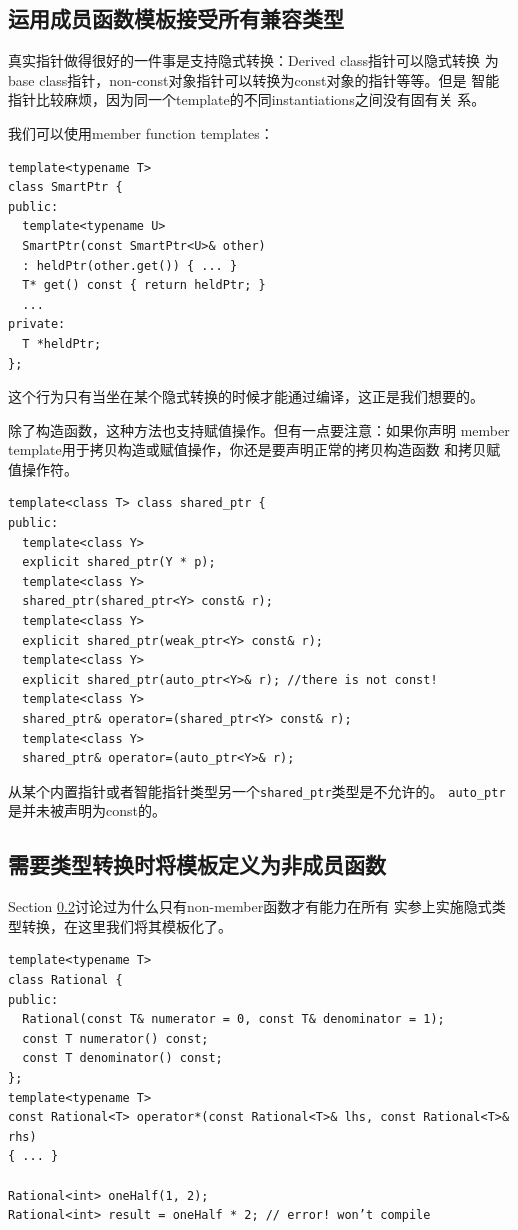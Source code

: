 \subsection{运用成员函数模板接受所有兼容类型}
\label{sec:Item-45}

真实指针做得很好的一件事是支持隐式转换：Derived class指针可以隐式转换
为base class指针，non-const对象指针可以转换为const对象的指针等等。但是
智能指针比较麻烦，因为同一个template的不同instantiations之间没有固有关
系。

我们可以使用member function templates：
\begin{verbatim}
template<typename T>
class SmartPtr {
public:
  template<typename U>
  SmartPtr(const SmartPtr<U>& other)
  : heldPtr(other.get()) { ... } 
  T* get() const { return heldPtr; }
  ...
private:
  T *heldPtr;
};
\end{verbatim}
这个行为只有当坐在某个隐式转换的时候才能通过编译，这正是我们想要的。

除了构造函数，这种方法也支持赋值操作。但有一点要注意：如果你声明
member template用于拷贝构造或赋值操作，你还是要声明正常的拷贝构造函数
和拷贝赋值操作符。
\begin{verbatim}
template<class T> class shared_ptr {
public:
  template<class Y> 
  explicit shared_ptr(Y * p);
  template<class Y> 
  shared_ptr(shared_ptr<Y> const& r); 
  template<class Y> 
  explicit shared_ptr(weak_ptr<Y> const& r);
  template<class Y>
  explicit shared_ptr(auto_ptr<Y>& r); //there is not const!
  template<class Y>
  shared_ptr& operator=(shared_ptr<Y> const& r);
  template<class Y> 
  shared_ptr& operator=(auto_ptr<Y>& r); 
\end{verbatim}
从某个内置指针或者智能指针类型另一个\texttt{shared\_ptr}类型是不允许的。
\texttt{auto\_ptr}是并未被声明为const的。

\subsection{需要类型转换时将模板定义为非成员函数}
\label{sec:Item-46}

Section \ref{sec:Item-46}讨论过为什么只有non-member函数才有能力在所有
实参上实施隐式类型转换，在这里我们将其模板化了。

\begin{verbatim}
template<typename T>
class Rational {
public:
  Rational(const T& numerator = 0, const T& denominator = 1); 
  const T numerator() const; 
  const T denominator() const;
};
template<typename T>
const Rational<T> operator*(const Rational<T>& lhs, const Rational<T>& rhs)
{ ... }

Rational<int> oneHalf(1, 2); 
Rational<int> result = oneHalf * 2; // error! won’t compile
\end{verbatim}

